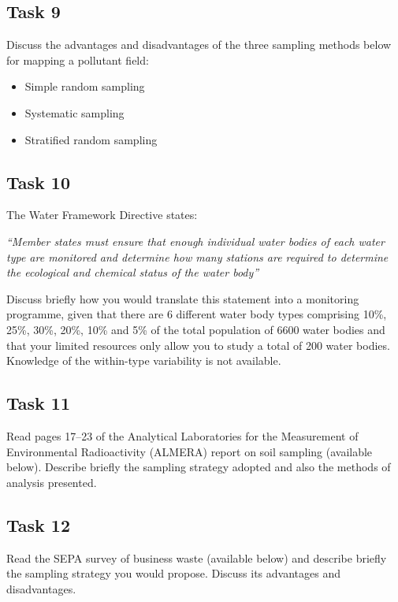 \documentclass[
  letterpaper,
  DIV=11,
  numbers=noendperiod]{scrartcl}
\providecommand{\tightlist}{%
  \setlength{\itemsep}{0pt}\setlength{\parskip}{0pt}}\usepackage{longtable,booktabs,array}
\begin{document}
\subsection*{Task 9}\label{task-9}

Discuss the advantages and disadvantages of the three sampling methods
below for mapping a pollutant field:

\begin{itemize}
\tightlist
\item
  Simple random sampling
\item
  Systematic sampling
\item
  Stratified random sampling
\end{itemize}

\subsection*{Task 10}\label{task-10}

The Water Framework Directive states:

\emph{``Member states must ensure that enough individual water bodies of
each water type are monitored and determine how many stations are
required to determine the ecological and chemical status of the water
body''}

Discuss briefly how you would translate this statement into a monitoring
programme, given that there are 6 different water body types comprising
10\%, 25\%, 30\%, 20\%, 10\% and 5\% of the total population of 6600
water bodies and that your limited resources only allow you to study a
total of 200 water bodies. Knowledge of the within-type variability is
not available.

\subsection*{Task 11}\label{task-11}

Read pages 17--23 of the Analytical Laboratories for the Measurement of
Environmental Radioactivity (ALMERA) report on soil sampling (available
below). Describe briefly the sampling strategy adopted and also the
methods of analysis presented.

\subsection*{Task 12}\label{task-12}

Read the SEPA survey of business waste (available below) and describe
briefly the sampling strategy you would propose. Discuss its advantages
and disadvantages.
\end{document}
